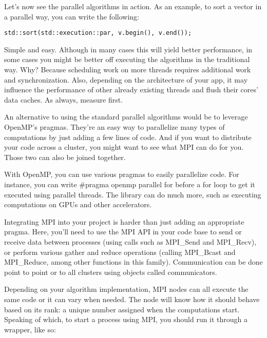 Let's now see the parallel algorithms in action. As an example, to sort a vector in a parallel way, you can write the following:

\begin{lstlisting}[style=styleCXX]
std::sort(std::execution::par, v.begin(), v.end());
\end{lstlisting}

Simple and easy. Although in many cases this will yield better performance, in some cases you might be better off executing the algorithms in the traditional way. Why? Because  scheduling work on more threads requires additional work and synchronization. Also, depending on the architecture of your app, it may influence the performance of other already existing threads and flush their cores' data caches. As always, measure first.


An alternative to using the standard parallel algorithms would be to leverage OpenMP's pragmas. They're an easy way to parallelize many types of computations by just adding a few lines of code. And if you want to distribute your code across a cluster, you might want to see what MPI can do for you. Those two can also be joined together.

With OpenMP, you can use various pragmas to easily parallelize code. For instance, you can write \#pragma openmp parallel for before a for loop to get it executed using parallel threads. The library can do much more, such as executing computations on GPUs and other accelerators.

Integrating MPI into your project is harder than just adding an appropriate pragma. Here, you'll need to use the MPI API in your code base to send or receive data between processes (using calls such as MPI\_Send and MPI\_Recv), or perform various gather and reduce operations (calling MPI\_Bcast and MPI\_Reduce, among other functions in this family). Communication can be done point to point or to all clusters using objects called communicators.

Depending on your algorithm implementation, MPI nodes can all execute the same code or it can vary when needed. The node will know how it should behave based on its rank: a unique number assigned when the computations start. Speaking of which, to start a process using MPI, you should run it through a wrapper, like so:


